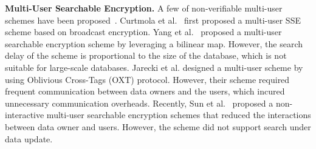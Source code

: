   \noindent\textbf{Multi-User Searchable Encryption.} A few of non-verifiable multi-user schemes have been proposed~\cite{curtmola2011searchable,yang2009multiuser,jarecki2013outsourced,sun2016efficient}. Curtmola et al.~\cite{curtmola2011searchable} first proposed a multi-user SSE scheme based on broadcast encryption. Yang et al.~\cite{yang2009multiuser} proposed a multi-user searchable encryption scheme by leveraging a bilinear map. However, the search delay of the scheme is proportional to the size of the database, which is not suitable for large-scale databases.
  Jarecki et al. \cite{jarecki2013outsourced} designed a multi-user scheme by using Oblivious Cross-Tags (OXT) protocol. However, their scheme required frequent communication between data owners and the users, which incured unnecessary communication overheads. Recently, Sun et al.~\cite{sun2016efficient} proposed a non-interactive multi-user searchable encryption schemes that reduced the interactions between data owner and users. However, the scheme did not support search under data update.
